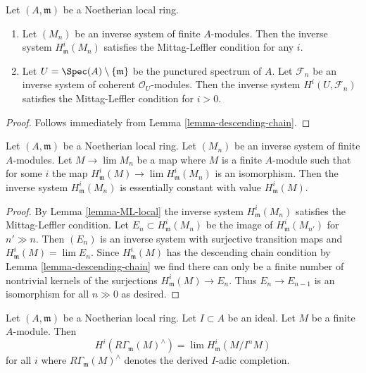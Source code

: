 \begin{lemma}
\label{lemma-ML-local}
Let $(A, \mathfrak m)$ be a Noetherian local ring.
\begin{enumerate}
\item Let $(M_n)$ be an inverse system of finite $A$-modules. Then the
inverse system $H^i_\mathfrak m(M_n)$ satisfies the Mittag-Leffler
condition for any $i$.
\item Let $U = \Spec(A) \setminus \{\mathfrak m\}$ be the
punctured spectrum of $A$.
Let $\mathcal{F}_n$ be an inverse system of
coherent $\mathcal{O}_U$-modules.
Then the inverse system $H^i(U, \mathcal{F}_n)$
satisfies the Mittag-Leffler condition for $i > 0$.
\end{enumerate}
\end{lemma}

\begin{proof}
Follows immediately from Lemma \ref{lemma-descending-chain}.
\end{proof}

\begin{lemma}
\label{lemma-terrific}
Let $(A, \mathfrak m)$ be a Noetherian local ring.
Let $(M_n)$ be an inverse system of finite $A$-modules.
Let $M \to \lim M_n$ be a map where $M$ is a finite $A$-module
such that for some $i$ the map
$H^i_\mathfrak m(M) \to \lim H^i_\mathfrak m(M_n)$
is an isomorphism.
Then the inverse system $H^i_\mathfrak m(M_n)$
is essentially constant with value $H^i_\mathfrak m(M)$.
\end{lemma}

\begin{proof}
By Lemma \ref{lemma-ML-local} the inverse system $H^i_\mathfrak m(M_n)$
satisfies the Mittag-Leffler condition. Let $E_n \subset H^i_\mathfrak m(M_n)$
be the image of $H^i_\mathfrak m(M_{n'})$ for $n' \gg n$.
Then $(E_n)$ is an inverse system with surjective transition maps
and $H^i_\mathfrak m(M) = \lim E_n$. Since $H^i_\mathfrak m(M)$
has the descending chain condition by
Lemma \ref{lemma-descending-chain}
we find there can only be a finite number of nontrivial
kernels of the surjections $H^i_\mathfrak m(M) \to E_n$.
Thus $E_n \to E_{n - 1}$ is an isomorphism for all $n \gg 0$
as desired.
\end{proof}

\begin{lemma}
\label{lemma-local-cohomology-derived-completion}
Let $(A, \mathfrak m)$ be a Noetherian local ring.
Let $I \subset A$ be an ideal. Let $M$ be a finite $A$-module.
Then
$$
H^i(R\Gamma_\mathfrak m(M)^\wedge) = \lim H^i_\mathfrak m(M/I^nM)
$$
for all $i$ where $R\Gamma_\mathfrak m(M)^\wedge$ denotes
the derived $I$-adic completion.
\end{lemma}

